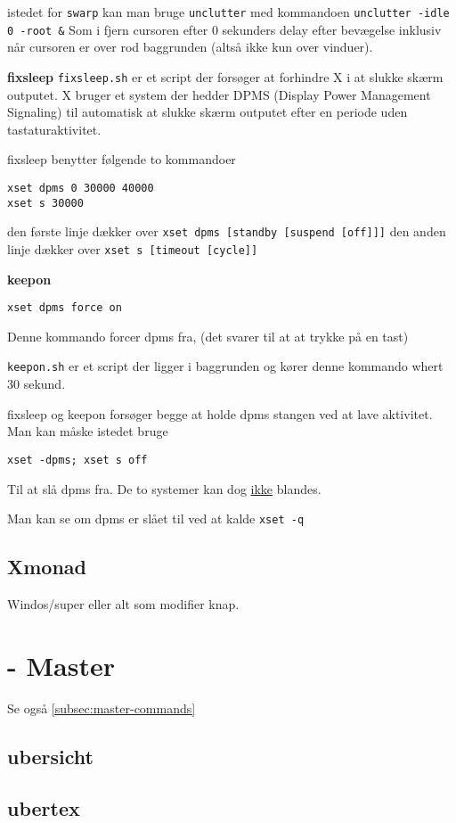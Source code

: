 \documentclass[10pt,a4paper,danish]{article}
\newcommand{\code}[1]{\colorbox{verbgray}{\texttt{#1}}}
\begin{document}
istedet for \texttt{swarp} kan man bruge \texttt{unclutter}
med kommandoen \code{unclutter -idle 0 -root \&}
Som i fjern cursoren efter 0 sekunders delay efter bevægelse inklusiv når
cursoren er over rod baggrunden (altså ikke kun over vinduer).

\textbf{fixsleep}
\texttt{fixsleep.sh} er et script der forsøger at forhindre X i at slukke skærm outputet.
X bruger et system der hedder DPMS (Display Power Management Signaling) til
automatisk at slukke skærm outputet efter en periode uden tastaturaktivitet.

fixsleep benytter følgende to kommandoer
\begin{verbatim}
xset dpms 0 30000 40000
xset s 30000
\end{verbatim}
den første linje dækker over \texttt{xset dpms [standby [suspend [off]]]}
den anden linje dækker over \texttt{xset s [timeout [cycle]]}

\textbf{keepon}
\begin{verbatim}
xset dpms force on
\end{verbatim}
Denne kommando forcer dpms fra, (det svarer til at at trykke på en tast)

\texttt{keepon.sh} er et script der ligger i baggrunden og kører denne kommando
whert 30 sekund.


fixsleep og keepon forsøger begge at holde dpms stangen ved at lave aktivitet.
Man kan måske istedet bruge
\begin{verbatim}
xset -dpms; xset s off
\end{verbatim}
Til at slå dpms fra.
De to systemer kan dog \uline{ikke} blandes.

Man kan se om dpms er slået til ved at kalde \code{xset -q}
\subsection{Xmonad}
Windos/super eller alt som modifier knap.

\newpage
\section{- Master}
Se også \ref{subsec:master-commands}

\subsection{ubersicht}
\label{subsec:ubersicht}
\subsection{ubertex}
\label{subsec:ubertex}
\end{document}

